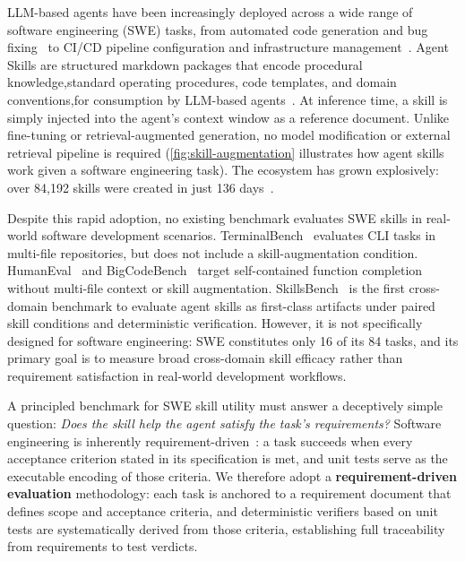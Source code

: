 \documentclass{article}
\begin{document}
LLM-based agents have been increasingly deployed across a wide range of software engineering (SWE) tasks, from automated code generation and bug fixing~\cite{jimenez2024swebench} to CI/CD pipeline configuration and infrastructure management~\cite{yang2024sweagent,song2025help}. 
Agent Skills are structured markdown packages that encode procedural knowledge,standard operating procedures, code templates, and domain conventions,for consumption by LLM-based agents~\cite{anthropic2025skills,fang2025memp,wang2023voyager,wang2024survey,xu2026agentskills}. 
At inference time, a skill is simply injected into the agent's context window as a reference document.
Unlike fine-tuning or retrieval-augmented generation, no model modification or external retrieval pipeline is required (\autoref{fig:skill-augmentation} illustrates how agent skills work given a software engineering task). 
The ecosystem has grown explosively: over 84{,}192 skills were created in just 136 days~\cite{li2026skillsbench}. 

Despite this rapid adoption, no existing benchmark evaluates SWE skills in real-world software development scenarios. 
TerminalBench~\cite{merrill2026terminalbench} evaluates CLI tasks in multi-file repositories, but does not include a skill-augmentation condition.
HumanEval~\cite{chen2021humaneval} and BigCodeBench~\cite{zhuo2025bigcodebench} target self-contained function completion without multi-file context or skill augmentation. 
SkillsBench~\cite{li2026skillsbench} is the first cross-domain benchmark to evaluate agent skills as first-class artifacts under paired skill conditions and deterministic verification. However, it is not specifically designed for software engineering: SWE constitutes only 16 of its 84 tasks, and its primary goal is to measure broad cross-domain skill efficacy rather than requirement satisfaction in real-world development workflows.

A principled benchmark for SWE skill utility must answer a deceptively simple question: \emph{Does the skill help the agent satisfy the task's requirements?}
Software engineering is inherently requirement-driven~\cite{sommerville2015software,zave1997classification,pohl2010requirements}: a task succeeds when every acceptance criterion stated in its specification is met, and unit tests serve as the executable encoding of those criteria.
We therefore adopt a \textbf{requirement-driven evaluation} methodology: each task is anchored to a requirement document that defines scope and acceptance criteria, and deterministic verifiers based on unit tests are systematically derived from those criteria, establishing full traceability from requirements to test verdicts.
\end{document}
